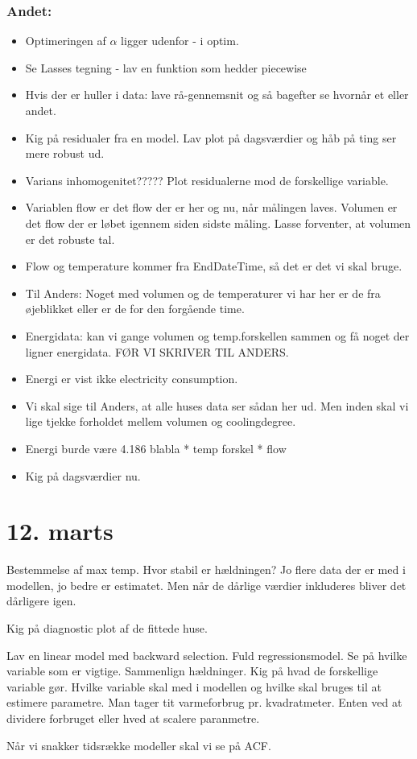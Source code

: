 \subsubsection{Andet:}
\begin{itemize}
    \item Optimeringen af $\alpha$ ligger udenfor - i optim.
    \item Se Lasses tegning - lav en funktion som hedder piecewise
    \item Hvis der er huller i data: lave rå-gennemsnit og så bagefter se hvornår et eller andet.
    \item Kig på residualer fra en model. Lav plot på dagsværdier og håb på ting ser mere robust ud. 
    \item Varians inhomogenitet????? Plot residualerne mod de forskellige variable. 
    \item Variablen flow er det flow der er her og nu, når målingen laves. Volumen er det flow der er løbet igennem siden sidste måling. Lasse forventer, at volumen er det robuste tal. 
    \item Flow og temperature kommer fra EndDateTime, så det er det vi skal bruge. 
    \item Til Anders: Noget med volumen og de temperaturer vi har her er de fra øjeblikket eller er de for den forgående time. 
    \item Energidata: kan vi gange volumen og temp.forskellen sammen og få noget der ligner energidata. FØR VI SKRIVER TIL ANDERS. 
    \item Energi er vist ikke electricity consumption. 
    \item Vi skal sige til Anders, at alle huses data ser sådan her ud. Men inden skal vi lige tjekke forholdet mellem volumen og coolingdegree. 
    \item Energi burde være 4.186 blabla * temp forskel * flow
    \item Kig på dagsværdier nu. 
\end{itemize}

\pagebreak

\section{12. marts}



Bestemmelse af max temp. Hvor stabil er hældningen? Jo flere data der er med i modellen, jo bedre er estimatet. Men når de dårlige
værdier inkluderes bliver det dårligere igen.

Kig på diagnostic plot af de fittede huse. 

Lav en linear model med backward selection. Fuld regressionsmodel. Se på hvilke variable som er vigtige. Sammenlign hældninger.
Kig på hvad de forskellige variable gør. Hvilke variable skal med i modellen og hvilke skal bruges til at estimere parametre.
Man tager tit varmeforbrug pr. kvadratmeter. Enten ved at dividere forbruget eller hved at scalere paranmetre.

Når vi snakker tidsrække modeller skal vi se på ACF.
